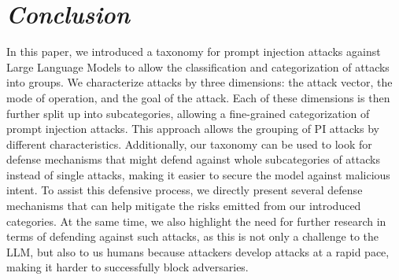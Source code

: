 \section{\textit{Conclusion}}
In this paper, we introduced a taxonomy for prompt injection attacks against Large Language Models to allow the classification and categorization of attacks into groups.
We characterize attacks by three dimensions: the attack vector, the mode of operation, and the goal of the attack. 
Each of these dimensions is then further split up into subcategories, allowing a fine-grained categorization of prompt injection attacks.
This approach allows the grouping of PI attacks by different characteristics.
Additionally, our taxonomy can be used to look for defense mechanisms that might defend against whole subcategories of attacks instead of single attacks, making it easier to secure the model against malicious intent. 
To assist this defensive process, we directly present several defense mechanisms that can help mitigate the risks emitted from our introduced categories.
At the same time, we also highlight the need for further research in terms of defending against such attacks, as this is not only a challenge to the LLM, but also to us humans because attackers develop attacks at a rapid pace, making it harder to successfully block adversaries.
